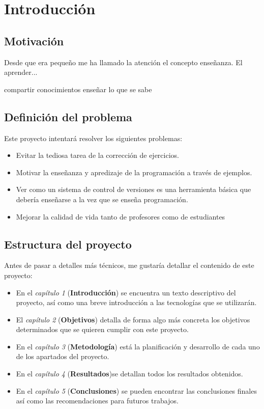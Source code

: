 \chapter{Introducción}

\section{Motivación}

Desde que era pequeño me ha llamado la atención el concepto enseñanza. El aprender...

compartir conocimientos
enseñar lo que se sabe




\blindtext

\section{Definición del problema}

\blindtext

Este proyecto intentará resolver los siguientes problemas:

\begin{itemize}
  \item Evitar la tediosa tarea de la corrección de ejercicios.
  \item Motivar la enseñanza y apredizaje de la programación a través de ejemplos.
  \item Ver como un sistema de control de versiones es una herramienta básica que debería enseñarse a la vez que se enseña programación.
  \item Mejorar la calidad de vida tanto de profesores como de estudiantes
\end{itemize}

\blindtext

\section{Estructura del proyecto}


\bigskip
Antes de pasar a detalles más técnicos, me gustaría detallar el contenido de este proyecto:

\begin{itemize}
  \item En el \textit{capítulo 1} (\textbf{Introducción}) se encuentra un texto descriptivo del proyecto, así como una breve introducción a las tecnologías que se utilizarán.
  \item El \textit{capítulo 2} (\textbf{Objetivos}) detalla de forma algo más concreta los objetivos determinados que se quieren cumplir con este proyecto.
  \item En el \textit{capítulo 3} (\textbf{Metodología}) está la planificación y desarrollo de cada uno de los apartados del proyecto.
  \item En el \textit{capítulo 4} (\textbf{Resultados})se detallan todos los resultados obtenidos.
  \item En el \textit{capítulo 5} (\textbf{Conclusiones}) se pueden encontrar las conclusiones finales  así como las recomendaciones para futuros trabajos.

\end{itemize}

